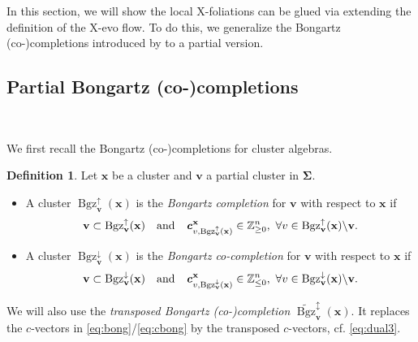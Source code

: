 \documentclass[11pt,reqno]{amsart}
\theoremstyle{plain}
\theoremstyle{definition}
\newtheorem{definition}[theorem]{Definition}
\numberwithin{equation}{section}
\newcommand\ZZ{\mathbb{Z}}
\newcommand\<{\langle}
\renewcommand\>{\rangle}
\def\vv{\mathbf{v}}
\def\sink{X}
\newcommand{\ccpt}[1]{\mathrm{#1}}%
\def\xevo{\ccpt{X}}%
\newcommand{\bfit}[1]{\textbf{\textit{#1}}}
\def\seeds{\mathbf{\Sigma}}
\def\xx{\mathbf{x}}%
\def\cvec{\bfit{c}}
\newcommand{\Bgzp}[2]{\operatorname{Bgz}^{\uparrow}_{#2}(#1)}
\newcommand{\Bgzm}[2]{\operatorname{Bgz}^{\downarrow}_{#2}(#1)}
\newcommand{\tBgzpm}[2]{\widetilde{\operatorname{Bgz}}^{\updownarrow}_{#2}(#1)}
\def\ZZp{\ZZ_{\ge0}}
\def\ZZm{\ZZ_{\le0}}
\begin{document}
In this section, we will show the local  $\xevo$-foliations can be glued via extending the definition of the $\xevo$-evo flow. 
To do this, we generalize the Bongartz (co-)completions introduced by \cite{CGY} to a partial version.


\subsection{Partial Bongartz (co-)completions}\

We first recall the Bongartz (co-)completions for cluster algebras.

\begin{definition}\cite[Def.~4.9]{CGY}\label{def:bong}
Let $\xx$ be a cluster and $\vv$ a partial cluster in $\seeds$.
\begin{itemize}
    \item A cluster $\Bgzp{\xx}{\vv}$ is the \emph{Bongartz completion} for $\vv$ with respect to $\xx$ if
    \begin{equation}\label{eq:bong}
    \vv\subset\Bgzp{\xx}{\vv}\quad\text{and}\quad
    \cvec^\xx_{v,\Bgzp{\xx}{\vv}}\in\ZZp^n,
    ~\forall v\in\Bgzp{\xx}{\vv}\backslash\vv.
    \end{equation}
    \item A cluster $\Bgzm{\xx}{\vv}$ is the \emph{Bongartz co-completion} for $\vv$ with respect to $\xx$ if
    \begin{equation}\label{eq:cbong}
    \vv\subset\Bgzm{\xx}{\vv}\quad\text{and}\quad
    \cvec^\xx_{v,\Bgzm{\xx}{\vv}}\in\ZZm^n,
    ~\forall v\in\Bgzm{\xx}{\vv}\backslash\vv.
\end{equation}
\end{itemize}
We will also use the \emph{transposed Bongartz (co-)completion} $\tBgzpm{\xx}{\vv}$.
It replaces the $c$-vectors in \eqref{eq:bong}/\eqref{eq:cbong} by the transposed $c$-vectors, cf. \eqref{eq:dual3}.
\end{definition}
\end{document}
